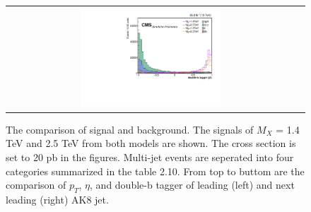 \begin{figure}[t]
\begin{tabular}{cc}
    \includegraphics[width=0.5\textwidth]{Figures/MC_N1/doubleSV_j1.pdf} \\
  \end{tabular}
  \caption{The comparison of signal and background. The signals of $M_{X}$ = 1.4 TeV and 2.5 TeV from both models are shown. The cross section is set to 20 pb in the figures. Multi-jet events are seperated into four categories summarized in the table 2.10. From top to buttom are the comparison of $p_{T}$, $\eta $, and double-b tagger of leading (left) and next leading (right) AK8 jet.}
  \label{fig:hvt_brs}
\end{figure}

